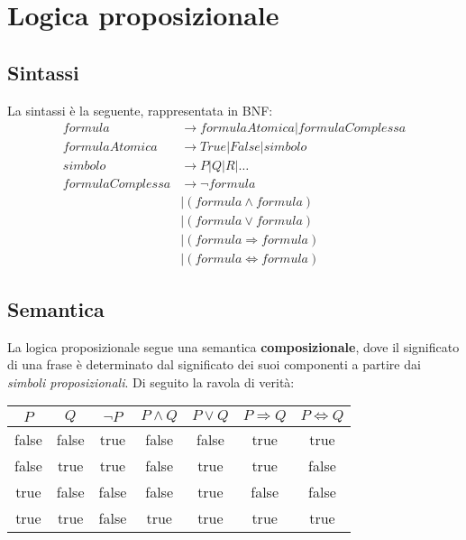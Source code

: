 \newpage
\section{Logica proposizionale}
\subsection{Sintassi}
La sintassi è la seguente, rappresentata in BNF:
\begin{equation}
	\begin{split}
		formula & \to formulaAtomica \vert formulaComplessa \\
		formulaAtomica & \to True \vert False \vert simbolo \\
		simbolo & \to P \vert Q \vert R \vert \ldots \\
		formulaComplessa & \to \neg formula \\
		&\vert (formula \land formula) \\
		& \vert (formula \lor formula)\\
		& \vert (formula \Rightarrow formula)\\
		& \vert (formula \Leftrightarrow formula)
	\end{split}
\end{equation}

\subsection{Semantica}
La logica proposizionale segue una semantica \textbf{composizionale}, dove il significato di una frase è determinato dal significato dei suoi componenti a partire dai \textit{simboli proposizionali}. Di seguito la ravola di verità:
\begin{table}[h!]
	\centering
	\begin{tabular}{|cc|ccccc|}
		\hline
		$P$ & $Q$ & $\neg P$ & $P \land Q$ & $P \lor Q$ & $ P \Rightarrow Q$ & $P \Leftrightarrow Q$\\
		\hline
		false & false & true & false & false & true & true \\
		false & true & true & false & true & true & false \\
		true & false & false & false & true & false & false \\
		true & true & false & true & true & true & true\\
		\hline
	\end{tabular}
\end{table}

